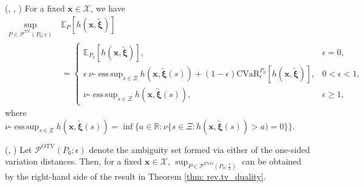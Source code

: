 \documentclass[final,onefignum,onetabnum]{class}
\DeclareMathOperator*{\esssup}{ess\,sup}
\newcommand{\ee}[2]{\mathbb{E}_{#1} \left[ #2 \right]}
\newcommand{\cccvar}[3]{\mathrm{CVaR}^{#1}_{#2} \left[ #3 \right]}
\newcommand{\bs}[1]{\boldsymbol{#1}} %
\newcommand{\Bs}[1]{\mathbb{#1}} %
\newcommand{\Cs}[1]{\mathcal{#1}} %
\newcommand{\txi}{\tilde{\bs{\xi}}}
\begin{document}
\begin{theorem}{(\citet[Theorems~1--2]{jiang2018}, \citet[Proposition~3]{rahimian2019}, \citet{shapiro2017DRSP})}
    \label{thm: rev.tv_duality} 
    For a fixed $\bs{x} \in \Cs{X}$, we have
    \begin{equation*}
        \begin{split}
            \sup_{P \in \Cs{P}^{\text{TV}}(P_{0};\epsilon)} \ & \ee{P}{h(\bs{x},\txi)} \\
            & {}= \begin{cases}
	    \ee{P_{0}}{h(\bs{x},\txi)}, &  \epsilon=0,\\
	    \epsilon  \  \nu\textrm{-}\esssup_{s \in \Xi} h(\bs{x}, \txi(s)) + (1-\epsilon) \cccvar{P_{0}}{\epsilon}{h(\bs{x}, \txi)}, &  0<\epsilon<1,\\
	    \nu\textrm{-}\esssup_{s \in \Xi} h(\bs{x}, \txi(s)), &  \epsilon\ge 1,
	    \end{cases}    
	    \end{split}
    \end{equation*}
    where $\nu\textrm{-}\esssup_{s \in \Xi} h(\bs{x}, \txi(s))=\inf\Big\{a \in \Bs{R}: \nu\{s \in \Xi: h(\bs{x},\txi(s))>a)=0\} \Big\}$.
\end{theorem}

\begin{remark}{(\citet[Proposition~3]{rahimian2019}, \citet{shapiro2017DRSP})}
    Let $\Cs{P}^{\text{OTV}}(P_{0};\epsilon)$ denote the ambiguity set formed via either of the  one-sided variation distances. Then,  for a fixed $\bs{x} \in \Cs{X}$, 
    $\sup_{P \in \Cs{P}^{\text{TVO}}(P_{0};\frac{\epsilon}{2})}$ can be obtained by the right-hand side of the result in Theorem \ref{thm: rev.tv_duality}. 
\end{remark}
\end{document}
